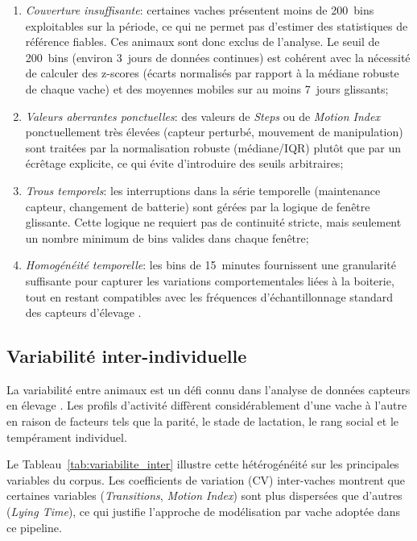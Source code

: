 \begin{enumerate}
    \item \textit{Couverture insuffisante}: certaines vaches présentent moins de 200~bins
    exploitables sur la période, ce qui ne permet pas d'estimer des statistiques de
    référence fiables. Ces animaux sont donc exclus de l'analyse. Le seuil de 200~bins
    (environ 3~jours de données continues) est cohérent avec la nécessité de calculer
    des z-scores (écarts normalisés par rapport à la médiane robuste de chaque vache) et
    des moyennes mobiles sur au moins 7~jours glissants;
    \item \textit{Valeurs aberrantes ponctuelles}: des valeurs de \textit{Steps} ou de \textit{Motion Index}
    ponctuellement très élevées (capteur perturbé, mouvement de manipulation) sont traitées
    par la normalisation robuste (médiane/IQR) plutôt que par un écrêtage explicite, ce qui
    évite d'introduire des seuils arbitraires;
    \item \textit{Trous temporels}: les interruptions dans la série temporelle (maintenance
    capteur, changement de batterie) sont gérées par la logique de fenêtre glissante. Cette
    logique ne requiert pas de continuité stricte, mais seulement un nombre minimum de bins
    valides dans chaque fenêtre;
    \item \textit{Homogénéité temporelle}: les bins de 15~minutes fournissent une granularité
    suffisante pour capturer les variations comportementales liées à la boiterie, tout en
    restant compatibles avec les fréquences d'échantillonnage standard des capteurs
    d'élevage \citep{ledgerwood2010lying}.
\end{enumerate}

\subsection{Variabilité inter-individuelle}

La variabilité entre animaux est un défi connu dans l'analyse de données capteurs en élevage
\citep{oleary2020accelerometers,nechanitzky2016analysis}. Les profils d'activité diffèrent
considérablement d'une vache à l'autre en raison de facteurs tels que la parité, le stade
de lactation, le rang social et le tempérament individuel.

Le Tableau~\ref{tab:variabilite_inter} illustre cette hétérogénéité sur les principales
variables du corpus. Les coefficients de variation (CV) inter-vaches montrent que certaines
variables (\textit{Transitions}, \textit{Motion Index}) sont plus dispersées que d'autres (\textit{Lying Time}),
ce qui justifie l'approche de modélisation par vache adoptée dans ce pipeline.

